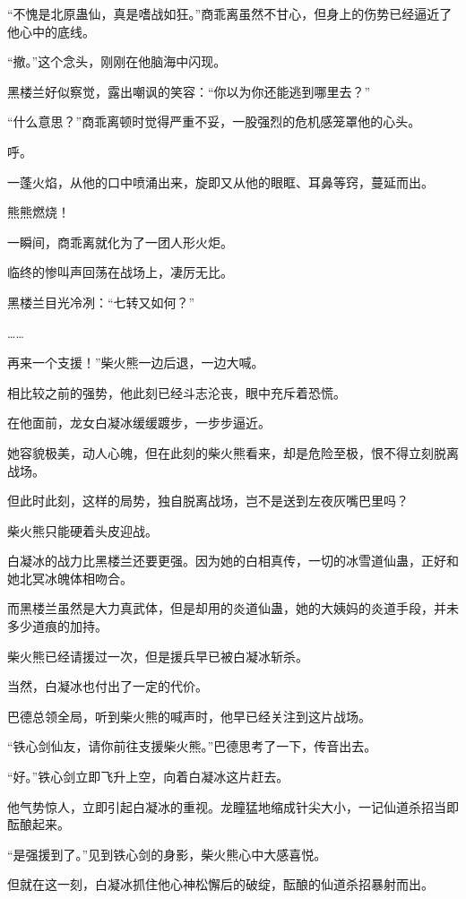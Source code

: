 \begin{this_body}
“不愧是北原蛊仙，真是嗜战如狂。”商乖离虽然不甘心，但身上的伤势已经逼近了他心中的底线。

“撤。”这个念头，刚刚在他脑海中闪现。

黑楼兰好似察觉，露出嘲讽的笑容：“你以为你还能逃到哪里去？”

“什么意思？”商乖离顿时觉得严重不妥，一股强烈的危机感笼罩他的心头。

呼。

一蓬火焰，从他的口中喷涌出来，旋即又从他的眼眶、耳鼻等窍，蔓延而出。

熊熊燃烧！

一瞬间，商乖离就化为了一团人形火炬。

临终的惨叫声回荡在战场上，凄厉无比。

黑楼兰目光冷冽：“七转又如何？”

……

再来一个支援！”柴火熊一边后退，一边大喊。

相比较之前的强势，他此刻已经斗志沦丧，眼中充斥着恐慌。

在他面前，龙女白凝冰缓缓踱步，一步步逼近。

她容貌极美，动人心魄，但在此刻的柴火熊看来，却是危险至极，恨不得立刻脱离战场。

但此时此刻，这样的局势，独自脱离战场，岂不是送到左夜灰嘴巴里吗？

柴火熊只能硬着头皮迎战。

白凝冰的战力比黑楼兰还要更强。因为她的白相真传，一切的冰雪道仙蛊，正好和她北冥冰魄体相吻合。

而黑楼兰虽然是大力真武体，但是却用的炎道仙蛊，她的大姨妈的炎道手段，并未多少道痕的加持。

柴火熊已经请援过一次，但是援兵早已被白凝冰斩杀。

当然，白凝冰也付出了一定的代价。

巴德总领全局，听到柴火熊的喊声时，他早已经关注到这片战场。

“铁心剑仙友，请你前往支援柴火熊。”巴德思考了一下，传音出去。

“好。”铁心剑立即飞升上空，向着白凝冰这片赶去。

他气势惊人，立即引起白凝冰的重视。龙瞳猛地缩成针尖大小，一记仙道杀招当即酝酿起来。

“是强援到了。”见到铁心剑的身影，柴火熊心中大感喜悦。

但就在这一刻，白凝冰抓住他心神松懈后的破绽，酝酿的仙道杀招暴射而出。


\end{this_body}
